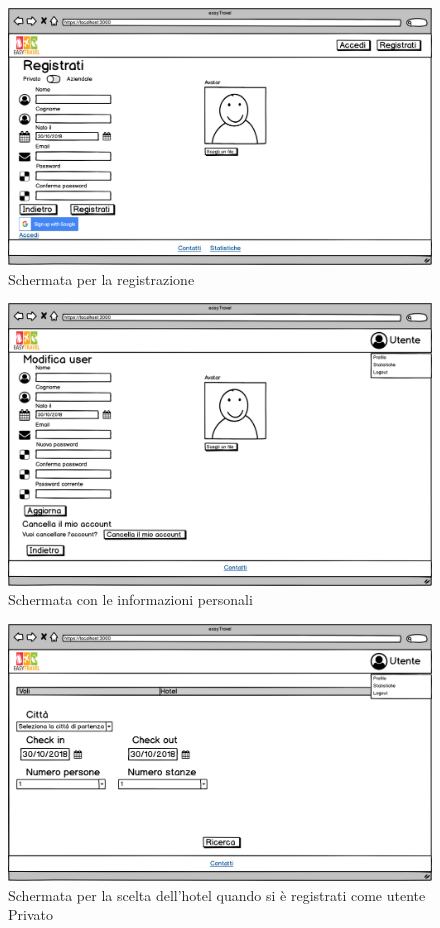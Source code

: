 \documentclass[11pt]{article}
\begin{document}
\begin{figure}[!ht]
	\includegraphics[width=1\textwidth]{./Mockup/Registrazione} %
	\caption{Schermata per la registrazione}
	\label{fig:registrazione}
\end{figure}

\begin{figure}[!ht]
	\includegraphics[width=1\textwidth]{./Mockup/Profilo-user-aziendale} %
	\caption{Schermata con le informazioni personali}
	\label{fig:profiloutente}
\end{figure}

\begin{figure}[!ht]
	\includegraphics[width=1\textwidth]{./Mockup/Hotel-user} %
	\caption{Schermata per la scelta dell'hotel quando si è registrati come utente Privato}
	\label{fig:hoteluser}
\end{figure}
\end{document}
